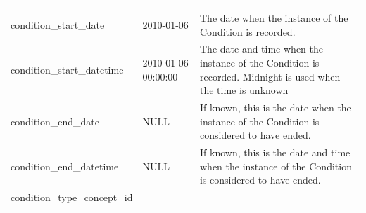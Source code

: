\documentclass[]{book}
\begin{document}
\begin{longtable}[]{@{}lll@{}}
\begin{minipage}[t]{0.50\columnwidth}
\end{minipage}\tabularnewline
\begin{minipage}[t]{0.27\columnwidth}\raggedright
condition\_start\_date\strut
\end{minipage} & \begin{minipage}[t]{0.14\columnwidth}\raggedright
2010-01-06\strut
\end{minipage} & \begin{minipage}[t]{0.50\columnwidth}\raggedright
The date when the instance of the Condition is recorded.\strut
\end{minipage}\tabularnewline
\begin{minipage}[t]{0.27\columnwidth}\raggedright
condition\_start\_datetime\strut
\end{minipage} & \begin{minipage}[t]{0.14\columnwidth}\raggedright
2010-01-06 00:00:00\strut
\end{minipage} & \begin{minipage}[t]{0.50\columnwidth}\raggedright
The date and time when the instance of the Condition is recorded. Midnight is used when the time is unknown\strut
\end{minipage}\tabularnewline
\begin{minipage}[t]{0.27\columnwidth}\raggedright
condition\_end\_date\strut
\end{minipage} & \begin{minipage}[t]{0.14\columnwidth}\raggedright
NULL\strut
\end{minipage} & \begin{minipage}[t]{0.50\columnwidth}\raggedright
If known, this is the date when the instance of the Condition is considered to have ended.\strut
\end{minipage}\tabularnewline
\begin{minipage}[t]{0.27\columnwidth}\raggedright
condition\_end\_datetime\strut
\end{minipage} & \begin{minipage}[t]{0.14\columnwidth}\raggedright
NULL\strut
\end{minipage} & \begin{minipage}[t]{0.50\columnwidth}\raggedright
If known, this is the date and time when the instance of the Condition is considered to have ended.\strut
\end{minipage}\tabularnewline
\begin{minipage}[t]{0.27\columnwidth}\raggedright
condition\_type\_concept\_id\strut
\end{minipage} & \begin{minipage}[t]{0.14\columnwidth}\raggedright

\end{minipage}
\end{longtable}
\end{document}
